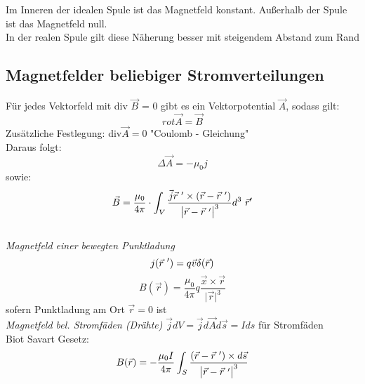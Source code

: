 \documentclass[a4paper,12pt]{report}
\begin{document}
Im Inneren der idealen Spule ist das Magnetfeld konstant. Außerhalb der Spule ist das Magnetfeld null.\\
In der realen Spule gilt diese Näherung besser mit steigendem Abstand zum Rand\\

\subsection{Magnetfelder beliebiger Stromverteilungen}

Für jedes Vektorfeld mit div $\vec{B}$ = 0 gibt es ein Vektorpotential $\vec{A}$, sodass gilt:\\
\begin{equation}
rot \vec{A} = \vec{B}
\end{equation}
Zusätzliche Festlegung: div$\vec{A} = 0$ "Coulomb - Gleichung" \\

Daraus folgt:\\
\begin{equation}
\Delta \vec{A} = - \mu_0 j
\end{equation}
sowie:
\begin{equation}
\vec{B} = \frac{\mu_0}{4\pi} \cdot \int_V \frac{\vec{j} \vec{r}\ \sp{\prime} \times (\vec{r} - \vec{r}\ \sp{\prime} )} {\bigl|\vec{r} - \vec{r}\ \sp{\prime} \bigl|^3} d^{3}\ \vec{r}\sp{\prime}
\end{equation}\\

\emph{Magnetfeld einer bewegten Punktladung}\\
\begin{equation}
j(\vec{r}\ \sp{\prime}) = q\vec{v}\delta(\vec{r})
\end{equation}
\begin{equation}
B(\vec{r}) = \frac{\mu_0}{4\pi} q \frac{\vec{x}\times \vec{r}}{\bigl|\vec{r}\bigl|^3}
\end{equation}
sofern Punktladung am Ort $\vec{r} = 0$ ist\\

\emph{Magnetfeld bel. Stromfäden (Drähte)}
$\vec{j}dV = \vec{j}d\vec{A}d\vec{s} = Ids $ für Stromfäden\\
Biot Savart Gesetz:
\begin{equation}
B(\vec{r}) = - \frac{\mu_0 I}{4\pi} \int_S \frac{(\vec{r} - \vec{r} \ \sp{\prime}) \times d\vec{s}}{\bigl|\vec{r} - \vec{r} \ \sp{\prime} \bigl|^3}
\end{equation}
\end{document}
